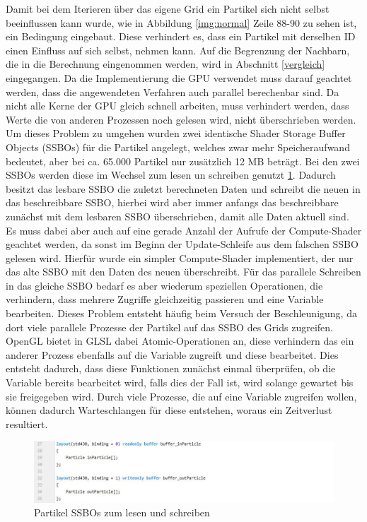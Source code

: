 \documentclass[intern,palatino]{cgBA}
\begin{document}
Damit bei dem Iterieren über das eigene Grid ein Partikel sich nicht selbst beeinflussen kann wurde, wie in Abbildung \ref{img:normal} Zeile 88-90 zu sehen ist, ein Bedingung eingebaut. Diese verhindert es, dass ein Partikel mit derselben ID einen Einfluss auf sich selbst, nehmen kann. Auf die Begrenzung der Nachbarn, die in die Berechnung eingenommen werden, wird in Abschnitt \ref{vergleich} eingegangen.
\newline
Da die Implementierung die GPU verwendet muss darauf geachtet werden, dass die angewendeten Verfahren auch parallel berechenbar sind. Da nicht alle Kerne der GPU gleich schnell arbeiten, muss verhindert werden, dass Werte die von anderen Prozessen noch gelesen wird, nicht überschrieben werden.
Um dieses Problem zu umgehen wurden zwei identische Shader Storage Buffer Objects (SSBOs) für die Partikel angelegt, welches zwar mehr Speicheraufwand bedeutet, aber bei ca. 65.000 Partikel nur zusätzlich 12 MB beträgt. Bei den zwei SSBOs werden diese im Wechsel zum lesen un schreiben genutzt \ref{img:flipflop}. Dadurch besitzt das lesbare SSBO die zuletzt berechneten Daten und schreibt die neuen in das beschreibbare SSBO, hierbei wird aber immer anfangs das beschreibbare zunächst mit dem lesbaren SSBO überschrieben, damit alle Daten aktuell sind.
Es muss dabei aber auch auf eine gerade Anzahl der Aufrufe der Compute-Shader geachtet werden, da sonst im Beginn der Update-Schleife aus dem falschen SSBO gelesen wird. Hierfür wurde ein simpler Compute-Shader implementiert, der nur das alte SSBO mit den Daten des neuen überschreibt.
\newline
Für das parallele Schreiben in das gleiche SSBO bedarf es aber wiederum speziellen Operationen, die verhindern, dass mehrere Zugriffe gleichzeitig passieren und eine Variable bearbeiten. Dieses Problem entsteht häufig beim Versuch der Beschleunigung, da dort viele parallele Prozesse der Partikel auf das SSBO des Grids zugreifen.
\newline
OpenGL bietet in GLSL dabei Atomic-Operationen an, diese verhindern das ein anderer Prozess ebenfalls auf die Variable zugreift und diese bearbeitet. Dies entsteht dadurch, dass diese Funktionen zunächst einmal überprüfen, ob die Variable bereits bearbeitet wird, falls dies der Fall ist, wird solange gewartet bis sie freigegeben wird. Durch viele Prozesse, die auf eine Variable zugreifen wollen, können dadurch Warteschlangen für diese entstehen, woraus ein Zeitverlust resultiert.

\begin{figure}[H]
	\centering
	\includegraphics[width=1.3\columnwidth]{Bilder/Flipflop.jpg}
	\caption{Partikel SSBOs zum lesen und schreiben}
	\label{img:flipflop}
\end{figure}
\end{document}
